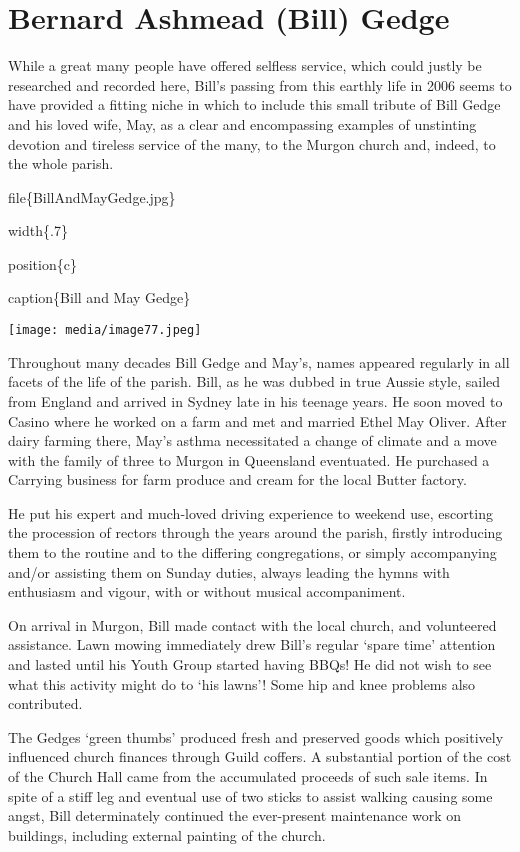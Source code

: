 \hypertarget{bernard-ashmead-bill-gedge}{%
\section{Bernard Ashmead (Bill) Gedge}\label{bernard-ashmead-bill-gedge}}

While a great many people have offered selfless service, which could justly be researched and recorded here, Bill's passing from this earthly life in 2006 seems to have provided a fitting niche in which to include this small tribute of Bill Gedge and his loved wife, May, as a clear and encompassing examples of unstinting devotion and tireless service of the many, to the Murgon church and, indeed, to the whole parish.

file\{BillAndMayGedge.jpg\}

width\{.7\}

position\{c\}

caption\{Bill and May Gedge\}

\texttt{[image: media/image77.jpeg]}

Throughout many decades Bill Gedge and May's, names appeared regularly in all facets of the life of the parish. Bill, as he was dubbed in true Aussie style, sailed from England and arrived in Sydney late in his teenage years. He soon moved to Casino where he worked on a farm and met and married Ethel May Oliver. After dairy farming there, May's asthma necessitated a change of climate and a move with the family of three to Murgon in Queensland eventuated. He purchased a Carrying business for farm produce and cream for the local Butter factory.

He put his expert and much-loved driving experience to weekend use, escorting the procession of rectors through the years around the parish, firstly introducing them to the routine and to the differing congregations, or simply accompanying and/or assisting them on Sunday duties, always leading the hymns with enthusiasm and vigour, with or without musical accompaniment.

On arrival in Murgon, Bill made contact with the local church, and volunteered assistance. Lawn mowing immediately drew Bill's regular `spare time' attention and lasted until his Youth Group started having BBQs! He did not wish to see what this activity might do to `his lawns'! Some hip and knee problems also contributed.

The Gedges `green thumbs' produced fresh and preserved goods which positively influenced church finances through Guild coffers. A substantial portion of the cost of the Church Hall came from the accumulated proceeds of such sale items. In spite of a stiff leg and eventual use of two sticks to assist walking causing some angst, Bill determinately continued the ever-present maintenance work on buildings, including external painting of the church.

